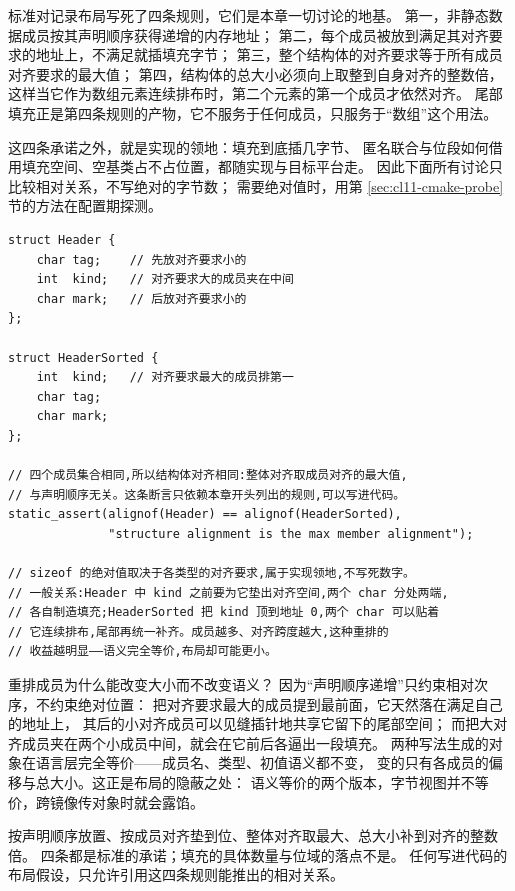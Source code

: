 \documentclass[12pt,a4paper,fontset=fandol]{ctexbook}
\begin{document}
标准对记录布局写死了四条规则，它们是本章一切讨论的地基。
第一，非静态数据成员按其声明顺序获得递增的内存地址；
第二，每个成员被放到满足其对齐要求的地址上，不满足就插填充字节；
第三，整个结构体的对齐要求等于所有成员对齐要求的最大值；
第四，结构体的总大小必须向上取整到自身对齐的整数倍，
这样当它作为数组元素连续排布时，第二个元素的第一个成员才依然对齐。
尾部填充正是第四条规则的产物，它不服务于任何成员，只服务于“数组”这个用法。

这四条承诺之外，就是实现的领地：填充到底插几字节、
匿名联合与位段如何借用填充空间、空基类占不占位置，都随实现与目标平台走。
因此下面所有讨论只比较相对关系，不写绝对的字节数；
需要绝对值时，用第 \ref{sec:cl11-cmake-probe} 节的方法在配置期探测。

\begin{lstlisting}[style=cppstyle, caption={同一组成员、两种声明顺序（对照示意；只断言相对关系）}]
struct Header {
    char tag;    // 先放对齐要求小的
    int  kind;   // 对齐要求大的成员夹在中间
    char mark;   // 后放对齐要求小的
};

struct HeaderSorted {
    int  kind;   // 对齐要求最大的成员排第一
    char tag;
    char mark;
};

// 四个成员集合相同,所以结构体对齐相同:整体对齐取成员对齐的最大值,
// 与声明顺序无关。这条断言只依赖本章开头列出的规则,可以写进代码。
static_assert(alignof(Header) == alignof(HeaderSorted),
              "structure alignment is the max member alignment");

// sizeof 的绝对值取决于各类型的对齐要求,属于实现领地,不写死数字。
// 一般关系:Header 中 kind 之前要为它垫出对齐空间,两个 char 分处两端,
// 各自制造填充;HeaderSorted 把 kind 顶到地址 0,两个 char 可以贴着
// 它连续排布,尾部再统一补齐。成员越多、对齐跨度越大,这种重排的
// 收益越明显——语义完全等价,布局却可能更小。
\end{lstlisting}

重排成员为什么能改变大小而不改变语义？
因为“声明顺序递增”只约束相对次序，不约束绝对位置：
把对齐要求最大的成员提到最前面，它天然落在满足自己的地址上，
其后的小对齐成员可以见缝插针地共享它留下的尾部空间；
而把大对齐成员夹在两个小成员中间，就会在它前后各逼出一段填充。
两种写法生成的对象在语言层完全等价——成员名、类型、初值语义都不变，
变的只有各成员的偏移与总大小。这正是布局的隐蔽之处：
语义等价的两个版本，字节视图并不等价，跨镜像传对象时就会露馅。

\begin{guideline}[title={布局算法的四条硬规则}]
按声明顺序放置、按成员对齐垫到位、整体对齐取最大、总大小补到对齐的整数倍。
四条都是标准的承诺；填充的具体数量与位域的落点不是。
任何写进代码的布局假设，只允许引用这四条规则能推出的相对关系。
\end{guideline}
\end{document}
